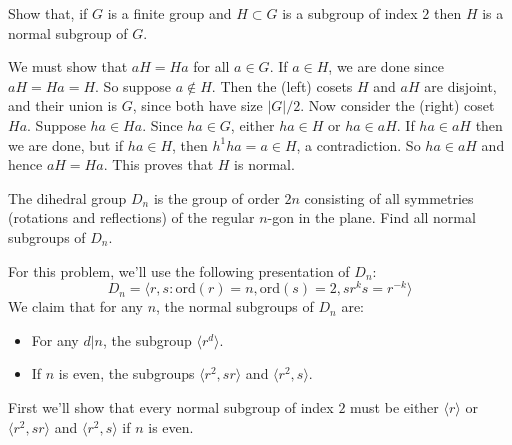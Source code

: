 \documentclass[11pt,letterpaper]{article}
\begin{document}
\pagebreak
\begin{problem}
  Show that, if $G$ is a finite group and $H\subset G$ is a subgroup of index $2$ then $H$ is a normal subgroup of $G$. 
\end{problem}

We must show that $aH=Ha$ for all $a\in G$. If $a\in H$, we are done since $aH=Ha=H$. So suppose $a\notin H$. Then the (left) cosets $H$ and $aH$ are disjoint, and their union is $G$, since both have size $|G|/2$. Now consider the (right) coset $Ha$. Suppose $ha\in Ha$. Since $ha\in G$, either $ha\in H$ or $ha\in aH$. If $ha\in aH$ then we are done, but if $ha\in H$, then $h^{1}ha=a\in H$, a contradiction. So $ha\in aH$ and hence $aH = Ha$. This proves that $H$ is normal.                   

\pagebreak
\begin{problem}
  The dihedral group $D_n$ is the group of order $2n$ consisting of all symmetries (rotations and reflections) of the regular $n$-gon in the plane. Find all normal subgroups of $D_n$.
\end{problem}

For this problem, we'll use the following presentation of $D_n$:
\[ D_n = \big\langle r,s : \mathrm{ord}(r)=n, \mathrm{ord}(s)=2, sr^ks=r^{-k}\big\rangle\] 
We claim that for any $n$, the normal subgroups of $D_n$ are:
\begin{itemize}
  \item For any $d|n$, the subgroup $\big\langle r^d \big\rangle$. 
  \item If $n$ is even, the subgroups $\big\langle r^2, sr\big\rangle$ and $\big\langle r^2, s \big\rangle$. 
\end{itemize}

First we'll show that every normal subgroup of index $2$ must be either $\big\langle r \big\rangle$ or $\big\langle r^2, sr\big\rangle$ and $\big\langle r^2, s \big\rangle$ if $n$ is even. 
  
\end{document}
